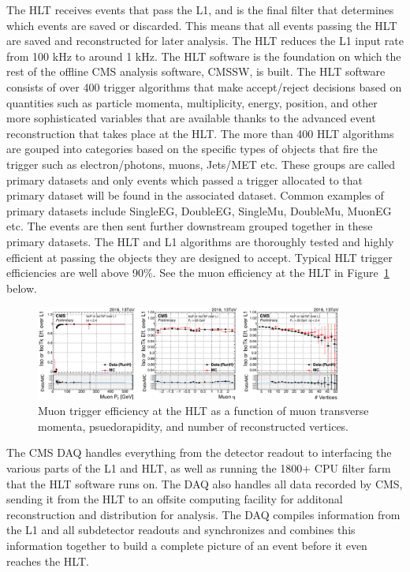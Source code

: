 The HLT receives events that pass the L1, and is the final filter that determines which events are saved or discarded. This means that all events passing the HLT are saved and reconstructed for later analysis.
The HLT reduces the L1 input rate from 100 kHz to around 1 kHz. The HLT software is the foundation on which the rest of the offline CMS analysis software, CMSSW, is built. The HLT software consists of over 400 trigger algorithms that make accept/reject decisions
based on quantities such as particle momenta, multiplicity, energy, position, and other more sophisticated variables that are available thanks to the advanced event reconstruction that takes place at the HLT.
The more than 400 HLT algorithms are gouped into categories based on the specific types of objects that fire the trigger such as electron/photons, muons, Jets/MET etc. These groups are called primary datasets and only events which passed a trigger
allocated to that primary dataset will be found in the associated dataset. Common examples of primary datasets include SingleEG, DoubleEG, SingleMu, DoubleMu, MuonEG etc. The events are then sent further downstream grouped together in these primary datasets.
The HLT and L1 algorithms are thoroughly tested and highly efficient at passing the objects they are
designed to accept. Typical HLT trigger efficiencies are well above 90$\%$. See the muon efficiency at the HLT in Figure~\ref{fig:hlt_eff_muons} below. 

\begin{figure}[hbtp]
 \begin{center}
   \includegraphics[width=0.9\textwidth]{ch3_figs/hlt_eff_muons.pdf}
   \caption[Trigger efficiency at the HLT]{Muon trigger efficiency at the HLT as a function of muon transverse momenta, psuedorapidity, and number of reconstructed vertices.}
   \label{fig:hlt_eff_muons}
 \end{center}
\end{figure}

The CMS DAQ handles everything from the detector readout to interfacing the various parts of the L1 and HLT, as well as running the 1800+ CPU filter farm that the HLT software runs on. The DAQ also handles all data recorded by CMS,
sending it from the HLT
to an offsite computing facility for additonal reconstruction and distribution for analysis. The DAQ compiles information from the L1 and all subdetector readouts and synchronizes and combines this information together to build a complete picture of an
event before it even reaches the HLT.    

